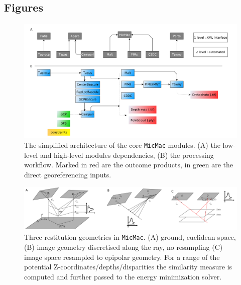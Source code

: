 \documentclass[twocolumn]{bmcart}%
\begin{document}
\begin{backmatter}

\section*{Figures}
%
\begin{figure}
\includegraphics[width=2\linewidth]{img/architecture.pdf}\caption{The simplified architecture of the core {\tt MicMac} modules. (A) the low-level and high-level modules dependencies, (B) the processing workflow. Marked in red are the outcome products, in green are the direct georeferencing inputs. }\label{fig:architecture}
\end{figure}
% 
\begin{figure}
\includegraphics[width=2\linewidth]{img/DIM_scenarios.pdf}\caption{Three restitution geometries in {\tt MicMac}. (A) ground, euclidean space, (B) image geometry discretised along the ray, no resampling (C) image space resampled to epipolar geometry. For a range of the potential Z-coordinates/depths/disparities the similarity measure is computed and further passed to the energy minimization solver.}\label{fig:matchGeom}
\end{figure}

\end{backmatter}
\end{document}
